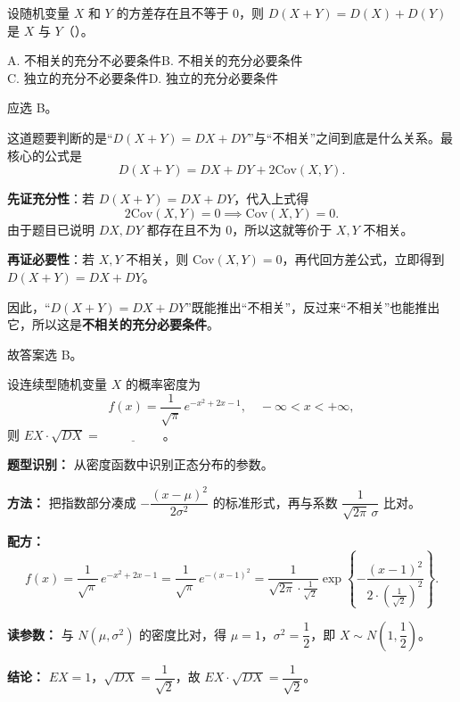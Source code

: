 ﻿\documentclass[lang=cn,11pt]{elegantbook}
\begin{document}
\begin{exercise}\label{exer:4-10-suff}
设随机变量 \(X\) 和 \(Y\) 的方差存在且不等于 0，则 \(D(X+Y) = D(X) + D(Y)\) 是 $X$ 与 $Y$（\quad）。\par
A. 不相关的充分不必要条件\quad B. 不相关的充分必要条件\quad\\
C. 独立的充分不必要条件\quad D. 独立的充分必要条件
\end{exercise}
\begin{solution}
应选 B。

这道题要判断的是“\(D(X+Y)=DX+DY\)”与“不相关”之间到底是什么关系。最核心的公式是
\[
D(X+Y)=DX+DY+2\mathrm{Cov}(X,Y).
\]

\textbf{先证充分性}：若 \(D(X+Y)=DX+DY\)，代入上式得
\[
2\mathrm{Cov}(X,Y)=0 \implies \mathrm{Cov}(X,Y)=0.
\]
由于题目已说明 \(DX,DY\) 都存在且不为 0，所以这就等价于 \(X,Y\) 不相关。

\textbf{再证必要性}：若 \(X,Y\) 不相关，则 \(\mathrm{Cov}(X,Y)=0\)，再代回方差公式，立即得到 \(D(X+Y)=DX+DY\)。

因此，“\(D(X+Y)=DX+DY\)”既能推出“不相关”，反过来“不相关”也能推出它，所以这是\textbf{不相关的充分必要条件}。

故答案选 B。
\end{solution}


\begin{exercise}\label{exer:4-4-normal}
设连续型随机变量 \(X\) 的概率密度为
\[
f(x) = \frac{1}{\sqrt{\pi}}\,e^{-x^2 + 2x - 1}, \quad -\infty < x < +\infty,
\]
则 \(EX \cdot \sqrt{DX} =\,\underline{\hspace{2cm}}\)。
\end{exercise}
\begin{solution}
\textbf{题型识别：} 从密度函数中识别正态分布的参数。

\textbf{方法：} 把指数部分凑成 $-\dfrac{(x-\mu)^2}{2\sigma^2}$ 的标准形式，再与系数 $\dfrac{1}{\sqrt{2\pi}\,\sigma}$ 比对。

\textbf{配方：}
\[
f(x) = \frac{1}{\sqrt{\pi}}\,e^{-x^2+2x-1} = \frac{1}{\sqrt{\pi}}\,e^{-(x-1)^2} = \frac{1}{\sqrt{2\pi}\cdot\frac{1}{\sqrt{2}}}\exp\!\left\{-\frac{(x-1)^2}{2\cdot\left(\frac{1}{\sqrt{2}}\right)^2}\right\}.
\]

\textbf{读参数：} 与 $N(\mu,\sigma^2)$ 的密度比对，得 $\mu = 1$，$\sigma^2 = \dfrac{1}{2}$，即 $X \sim N\!\left(1,\dfrac{1}{2}\right)$。

\textbf{结论：} $EX = 1$，$\sqrt{DX} = \dfrac{1}{\sqrt{2}}$，故 $EX \cdot \sqrt{DX} = \dfrac{1}{\sqrt{2}}$。
\end{solution}
\end{document}
